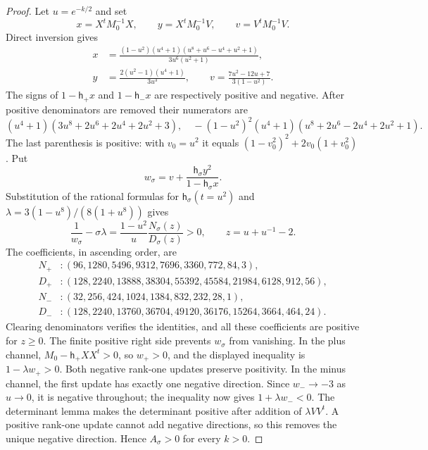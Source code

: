\begin{proof}
Let \(u=e^{-k/2}\) and set
\[
x=X^tM_0^{-1}X,\qquad y=X^tM_0^{-1}V,\qquad v=V^tM_0^{-1}V.
\]
Direct inversion gives
\[
\begin{aligned}
x&=\frac{(1-u^2)(u^4+1)(u^8+u^6-u^4+u^2+1)}
        {3u^6(u^2+1)},\\
y&=\frac{2(u^2-1)(u^4+1)}{3u^3},\qquad
v=\frac{7u^2-12u+7}{3(1-u^2)}.
\end{aligned}
\]
The signs of \(1-\mathsf h_+x\) and \(1-\mathsf h_-x\) are respectively positive and negative. After positive denominators are removed their numerators are
\[
(u^4+1)(3u^8+2u^6+2u^4+2u^2+3),\quad
-(1-u^2)^2(u^4+1)(u^8+2u^6-2u^4+2u^2+1).
\]
The last parenthesis is positive: with \(v_0=u^2\) it equals
\((1-v_0^2)^2+2v_0(1+v_0^2)\). Put
\[
w_\sigma=v+\frac{\mathsf h_\sigma y^2}{1-\mathsf h_\sigma x}.
\]
Substitution of the rational formulas for \(\mathsf h_\sigma(t=u^2)\) and
\(\lambda=3(1-u^8)/(8(1+u^8))\) gives
\[
\frac1{w_\sigma}-\sigma\lambda
=\frac{1-u^2}{u}\frac{N_\sigma(z)}{D_\sigma(z)}>0,
\qquad z=u+u^{-1}-2.
\]
The coefficients, in ascending order, are
\[
\begin{aligned}
N_+&:(96,1280,5496,9312,7696,3360,772,84,3),\\
D_+&:(128,2240,13888,38304,55392,45584,21984,6128,912,56),\\
N_-&:(32,256,424,1024,1384,832,232,28,1),\\
D_-&:(128,2240,13760,36704,49120,36176,15264,3664,464,24).
\end{aligned}
\]
Clearing denominators verifies the identities, and all these coefficients are positive for \(z\ge0\). The finite positive right side prevents \(w_\sigma\) from vanishing. In the plus channel, \(M_0-\mathsf h_+XX^t>0\), so \(w_+>0\), and the displayed inequality is \(1-\lambda w_+>0\). Both negative rank-one updates preserve positivity. In the minus channel, the first update has exactly one negative direction. Since \(w_-\to-3\) as \(u\to0\), it is negative throughout; the inequality now gives \(1+\lambda w_-<0\). The determinant lemma makes the determinant positive after addition of \(\lambda VV^t\). A positive rank-one update cannot add negative directions, so this removes the unique negative direction. Hence \(A_\sigma>0\) for every \(k>0\).


\end{proof}
